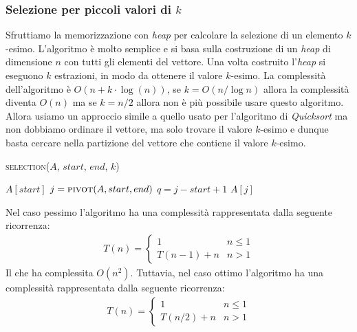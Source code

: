     \subsubsection{Selezione per piccoli valori di $k$}
        Sfruttiamo la memorizzazione con \textit{heap} per calcolare la selezione di un elemento $k$-esimo. L'algoritmo è molto semplice e si basa sulla costruzione di un \textit{heap} di dimensione $n$ con tutti gli elementi del vettore. Una volta costruito l'\textit{heap} si eseguono $k$ estrazioni, in modo da ottenere il valore $k$-esimo. La complessità dell'algoritmo è $O(n+k\cdot\log(n))$, se $k=O(n/\log n)$ allora la complessità diventa $O(n)$ ma se $k=n/2$ allora non è più possibile usare questo algoritmo. Allora usiamo un approccio simile a quello usato per l'algoritmo di \textit{Quicksort} ma non dobbiamo ordinare il vettore, ma solo trovare il valore $k$-esimo e dunque basta cercare nella partizione del vettore che contiene il valore $k$-esimo. 
        \begin{algorithm}[H]
            \caption{\Item \textsc{selection}(\Item[] $A$, \Int $start$, \Int $end$, \Int $k$)}
            \begin{algorithmic}
                    \State \Return $A[start]$
                \Else
                    \State $j = \Call{pivot}{A, start, end}$
                    \State $q = j - start + 1$
                        \State \Return $A[j]$
                        \State \Return {}
                    \Else
                        \State \Return {}
                    \EndIf
                \EndIf
            \end{algorithmic}
        \end{algorithm}
        Nel caso pessimo l'algoritmo ha una complessità rappresentata dalla seguente ricorrenza:
        \begin{align*}
            T(n) = \begin{cases}
                1 & n\leq 1 \\
                T(n-1) + n & n > 1
            \end{cases}
        \end{align*}
        Il che ha complessita $O(n^2)$. Tuttavia, nel caso ottimo l'algoritmo ha una complessità rappresentata dalla seguente ricorrenza:
        \begin{align*}
            T(n) = \begin{cases}
                1 & n\leq 1 \\
                T(n/2) + n & n > 1
            \end{cases}
        \end{align*}
